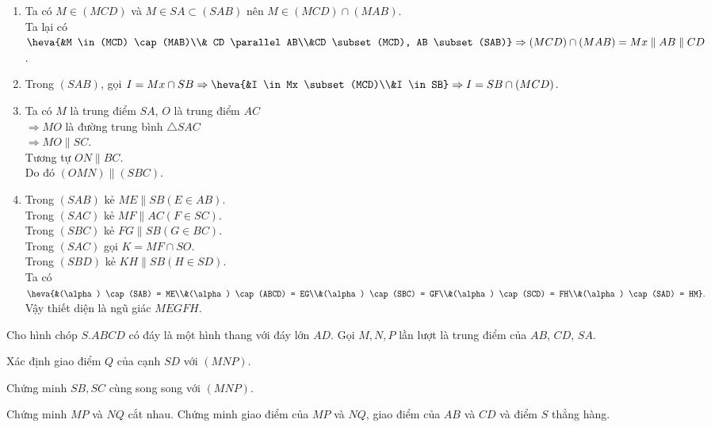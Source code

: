 \begin{bt}
\begin{bt}
{\begin{center}
	\end{center}
	\begin{enumerate}
	\item Ta có $M \in (MCD)$ và $M \in SA \subset (SAB)$ nên $M \in (MCD) \cap (MAB)$.\\
	Ta lại có $\heva{&M \in (MCD) \cap (MAB)\\& CD \parallel AB\\&CD \subset (MCD), AB \subset (SAB)} \Rightarrow (MCD) \cap (MAB) = Mx \parallel AB \parallel CD$.
	\item Trong $(SAB)$, gọi $I = Mx \cap SB \Rightarrow \heva{&I \in Mx \subset(MCD)\\&I \in SB} \Rightarrow I = SB \cap (MCD)$.
	\item Ta có $M$ là trung điểm $SA$, $O$ là trung điểm $AC$\\
	$\Rightarrow MO$ là đường trung bình $\triangle SAC$\\
	$\Rightarrow MO \parallel SC$.\\
	Tương tự $ON \parallel BC$.\\
	Do đó $(OMN) \parallel (SBC)$.
	\item Trong $(SAB )$  kẻ $ME \parallel SB (E \in AB)$.\\
	Trong $(SAC )$ kẻ $MF \parallel AC (F \in SC)$.\\
	Trong $(SBC )$ kẻ $FG \parallel SB (G \in BC)$.\\
	Trong $(SAC )$ gọi $K = MF \cap SO$.\\
	Trong $(SBD )$ kẻ $KH \parallel SB (H \in SD)$.\\
	Ta có $\heva{&(\alpha) \cap (SAB) = ME\\&(\alpha) \cap (ABCD) = EG\\&(\alpha) \cap (SBC) = GF\\&(\alpha) \cap (SCD) = FH\\&(\alpha) \cap (SAD) = HM}.$\\
	Vậy thiết diện là ngũ giác $MEGFH$.
	\end{enumerate}
}
\end{bt}

\begin{bt}%
Cho hình chóp $S.ABCD$ có đáy là một hình thang với đáy lớn $AD$. Gọi $M,N,P$ lần lượt là trung điểm của $AB$, $CD$, $SA$.
\begin{listEX}
\item Xác định giao điểm $Q$ của cạnh $SD$ với $\left(MNP\right)$.
\item  Chứng minh $SB,SC$ cùng song song với $\left(MNP\right)$.
\item  Chứng minh $MP$ và $NQ$ cắt nhau. Chứng minh giao điểm của $MP$ và $NQ$, giao điểm của $AB$ và $CD$ và điểm $S$ thẳng hàng.
\end{listEX}


\end{bt}
\end{bt}
